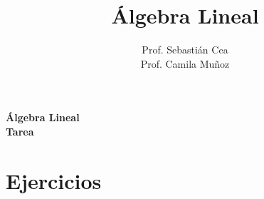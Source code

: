 \documentclass[12pt]{article}
\title{\'Algebra Lineal}
\author{Prof. Sebasti\'an Cea \\Prof. Camila Muñoz\\
}
\date{}
\theoremstyle{exampstyle}
\theoremstyle{definition}
\theoremstyle{break}
\numberwithin{equation}{section}
\begin{document}

\begin{minipage}[r]{15cm}


\end{minipage}

\begin{center}
\Large{\textbf{\'Algebra Lineal\\Tarea  }}
\end{center}

\section{Ejercicios}
\end{document}
